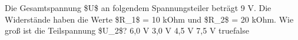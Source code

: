    {Die Gesamtspannung \$U\$ an folgendem Spannungsteiler beträgt 9 V. Die Widerstände haben die Werte \$R\_1\$ = 10 kOhm und \$R\_2\$ = 20 kOhm. Wie groß ist die Teilspannung \$U\_2\$?}
    {6,0 V}
    {3,0 V}
    {4,5 V}
    {7,5 V}
    {true}{false}